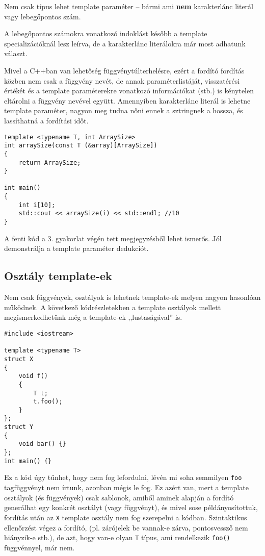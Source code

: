 \documentclass[a4paper,11.5pt,table]{article}
\begin{document}
	Nem csak típus lehet template paraméter -- bármi ami \textbf{nem} karakterlánc literál vagy lebegőpontos szám.
	\begin{note}
		A lebegőpontos számokra vonatkozó indoklást később a template specializációknál lesz leírva, de a karakterlánc literálokra már most adhatunk választ.
		
		Mivel a C++ban van lehetőség függvénytúlterhelésre, ezért a fordító fordítás közben nem csak a függvény nevét, de annak paraméterlistáját, visszatérési értékét és a template paraméterekre vonatkozó információkat (stb.) is kénytelen eltárolni a függvény nevével együtt. Amennyiben karakterlánc literál is lehetne template paraméter, nagyon meg tudna nőni ennek a sztringnek a hossza, és lassíthatná a fordítási időt.
	\end{note}
	\begin{lstlisting}
template <typename T, int ArraySize>
int arraySize(const T (&array)[ArraySize])
{
	return ArraySize;
}

int main()
{
	int i[10];
	std::cout << arraySize(i) << std::endl; //10
}
	\end{lstlisting}
	A fenti kód a 3. gyakorlat végén tett megjegyzésből lehet ismerős. Jól demonstrálja a template paraméter dedukciót.
	\subsection{Osztály template-ek}
	Nem csak függvények, osztályok is lehetnek template-ek melyen nagyon hasonlóan működnek. A következő kódrészletekben a template osztályok mellett megismerkedhetünk még a template-ek ,,lustaságával'' is.
	\begin{lstlisting}
#include <iostream>

template <typename T>
struct X
{
	void f()
	{
		T t;
		t.foo();
	}
};
struct Y
{
	void bar() {}
};
int main() {}
	\end{lstlisting}
	Ez a kód úgy tűnhet, hogy nem fog lefordulni, lévén mi soha semmilyen \texttt{foo} tagfüggvényt nem írtunk, azonban mégis le fog. Ez azért van, mert a template osztályok (és függvények) csak sablonok, amiből aminek alapján a fordító generálhat egy konkrét osztályt (vagy függvényt), és mivel sose példányosítottuk, fordítás után az \texttt{X} template osztály nem fog szerepelni a kódban. Szintaktikus ellenőrzést végez a fordító, (pl. zárójelek be vannak-e zárva, pontosvessző nem hiányzik-e stb.), de azt, hogy van-e olyan \texttt{T} típus, ami rendelkezik \texttt{foo()} függvénnyel, már nem.
	
\end{document}
